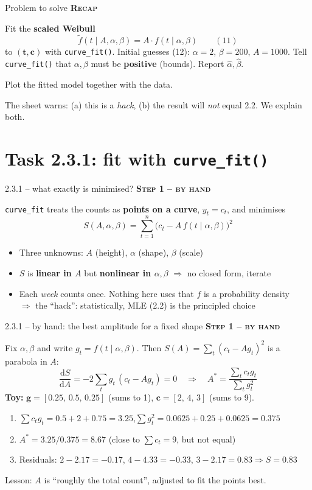 \documentclass[aspectratio=169,11pt]{beamer}
\newcommand{\stage}[2]{{\color{#1}\bfseries\small\textsc{#2}}\par\smallskip}
\newcommand{\Byhand}{\stage{hand}{Step 1 -- by hand}}
\newcommand{\Given}{\stage{given}{Recap}}
\begin{document}
\begin{frame}{Problem to solve}\small
\Given
\begin{description}[Task 2.3.2]
\item[Task 2.3.1] Fit the \textbf{scaled Weibull}
\[\tilde f(t\mid A,\alpha,\beta)=A\cdot f(t\mid\alpha,\beta)\qquad(11)\]
to $(\bm t,\bm c)$ with \texttt{curve\_fit()}. Initial guesses (12): $\alpha=2$, $\beta=200$, $A=1000$.
Tell \texttt{curve\_fit()} that $\alpha,\beta$ must be \textbf{positive} (bounds). Report $\hat\alpha,\hat\beta$.
\item[Task 2.3.2] Plot the fitted model together with the data.
\end{description}
\medskip
The sheet warns: (a) this is a \emph{hack}, (b) the result will \emph{not} equal 2.2. We explain both.
\end{frame}

\section{Task 2.3.1: fit with \texttt{curve\_fit()}}

\begin{frame}{2.3.1 -- what exactly is minimised?}
\Byhand
\texttt{curve\_fit} treats the counts as \textbf{points on a curve}, $y_t=c_t$, and minimises
\[
S(A,\alpha,\beta)=\sum_{t=1}^{n}\Big(c_t-A\,f(t\mid\alpha,\beta)\Big)^2
\]
\begin{itemize}
\item Three unknowns: $A$ (height), $\alpha$ (shape), $\beta$ (scale)
\item $S$ is \textbf{linear in $A$} but \textbf{nonlinear in $\alpha,\beta$} $\Rightarrow$ no closed form, iterate
\item Each \emph{week} counts once. Nothing here uses that $f$ is a probability density\\
$\Rightarrow$ the ``hack'': statistically, MLE (2.2) is the principled choice
\end{itemize}
\end{frame}

\begin{frame}{2.3.1 -- by hand: the best amplitude for a fixed shape}\small
\Byhand
Fix $\alpha,\beta$ and write $g_t=f(t\mid\alpha,\beta)$. Then $S(A)=\sum_t(c_t-Ag_t)^2$ is a parabola in $A$:
\[
\frac{\mathrm dS}{\mathrm dA}=-2\sum_t g_t\,(c_t-Ag_t)=0
\quad\Longrightarrow\quad
A^*=\frac{\sum_t c_tg_t}{\sum_t g_t^2}
\]
\textbf{Toy:} $\bm g=[0.25,\,0.5,\,0.25]$ (sums to 1), $\bm c=[2,\,4,\,3]$ (sums to 9).
\begin{enumerate}
\item $\sum c_tg_t=0.5+2+0.75=3.25$,\quad $\sum g_t^2=0.0625+0.25+0.0625=0.375$
\item $A^*=3.25/0.375=8.67$ \quad (close to $\sum c_t=9$, but not equal)
\item Residuals: $2-2.17=-0.17$,\; $4-4.33=-0.33$,\; $3-2.17=0.83$\quad$\Rightarrow S=0.83$
\end{enumerate}
\alert{Lesson:} $A$ is ``roughly the total count'', adjusted to fit the points best.
\end{frame}
\end{document}
